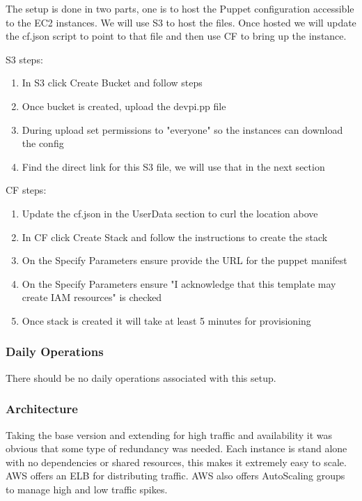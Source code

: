 \documentclass[12pt, letterpaper]{article}
\begin{document}
The setup is done in two parts, one is to host the Puppet configuration accessible to the EC2 instances. We will use
S3 to host the files. Once hosted we will update the cf.json script to point to that file and then use CF to bring
up the instance.

S3 steps:
\begin{enumerate}
    \item In S3 click Create Bucket and follow steps
    \item Once bucket is created, upload the devpi.pp file
    \item During upload set permissions to "everyone" so the instances can download the config
    \item Find the direct link for this S3 file, we will use that in the next section
\end{enumerate}

CF steps:
\begin{enumerate}
    \item Update the cf.json in the UserData section to curl the location above
    \item In CF click Create Stack and follow the instructions to create the stack
    \item On the Specify Parameters ensure provide the URL for the puppet manifest  
    \item On the Specify Parameters ensure "I acknowledge that this template may create IAM resources" is checked
    \item Once stack is created it will take at least 5 minutes for provisioning
\end{enumerate}

\subsubsection{Daily Operations}
There should be no daily operations associated with this setup.

\subsubsection{Architecture}
Taking the base version and extending for high traffic and availability it was obvious that some type of redundancy was needed. 
Each instance is stand alone with no dependencies or shared resources, this makes it extremely easy to scale. AWS offers an 
ELB for distributing traffic. AWS also offers AutoScaling groups to manage high and low traffic spikes.
\end{document}
